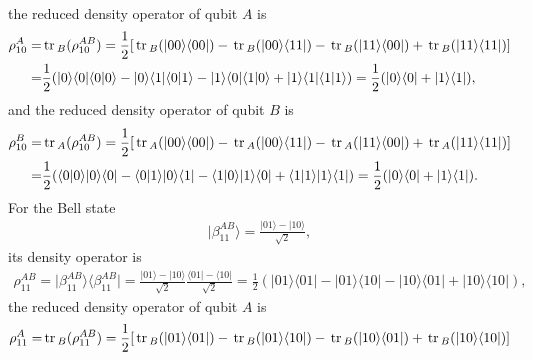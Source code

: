 \documentclass[en]{sol-man}
\begin{document}
\begin{sol}
\begin{align}
    \end{align}
    the reduced density operator of qubit $A$ is
    \begin{align}
        \notag\rho_{10}^A=&\,\mathrm{tr}\,_B(\rho_{10}^{AB})=\frac{1}{2}[\,\mathrm{tr}\,_B(\lvert 00\rangle\langle 00\rvert)-\,\mathrm{tr}\,_B(\lvert 00\rangle\langle 11\rvert)-\,\mathrm{tr}\,_B(\lvert 11\rangle\langle 00\rvert)+\,\mathrm{tr}\,_B(\lvert 11\rangle\langle 11\rvert)]\\
        =&\frac{1}{2}(\lvert 0\rangle\langle 0\rvert\langle 0\vert 0\rangle-\lvert 0\rangle\langle 1\rvert\langle 0\vert 1\rangle-\lvert 1\rangle\langle 0\rvert\langle 1\vert 0\rangle+\lvert 1\rangle\langle 1\rvert\langle 1\vert 1\rangle)=\frac{1}{2}(\lvert 0\rangle\langle 0\rvert+\lvert 1\rangle\langle 1\rvert),
    \end{align}
    and the reduced density operator of qubit $B$ is
    \begin{align}
        \notag\rho_{10}^B=&\,\mathrm{tr}\,_A(\rho_{10}^{AB})=\frac{1}{2}[\,\mathrm{tr}\,_A(\lvert 00\rangle\langle 00\rvert)-\,\mathrm{tr}\,_A(\lvert 00\rangle\langle 11\rvert)-\,\mathrm{tr}\,_A(\lvert 11\rangle\langle 00\rvert)+\,\mathrm{tr}\,_A(\lvert 11\rangle\langle 11\rvert)]\\
        =&\frac{1}{2}(\langle 0\vert 0\rangle\lvert 0\rangle\langle 0\rvert-\langle 0\vert 1\rangle\lvert 0\rangle\langle 1\rvert-\langle 1\vert 0\rangle\lvert 1\rangle\langle 0\rvert+\langle 1\vert 1\rangle\lvert 1\rangle\langle 1\rvert)=\frac{1}{2}(\lvert 0\rangle\langle 0\rvert+\lvert 1\rangle\langle 1\rvert).
    \end{align}
    For the Bell state
    \begin{align}
        \lvert\beta_{11}^{AB}\rangle=\frac{\lvert 01\rangle-\lvert 10\rangle}{\sqrt{2}},
    \end{align}
    its density operator is
    \begin{align}
        \rho_{11}^{AB}=\lvert\beta_{11}^{AB}\rangle\langle\beta_{11}^{AB}\rvert=\frac{\lvert 01\rangle-\lvert 10\rangle}{\sqrt{2}}\frac{\langle 01\rvert-\langle 10\rvert}{\sqrt{2}}=\frac{1}{2}(\lvert 01\rangle\langle 01\rvert-\lvert 01\rangle\langle 10\rvert-\lvert 10\rangle\langle 01\rvert+\lvert 10\rangle\langle 10\rvert),
    \end{align}
    the reduced density operator of qubit $A$ is
    \begin{align}
        \notag\rho_{11}^A=&\tr_B(\rho_{11}^{AB})=\frac{1}{2}[\tr_B(\lvert 01\rangle\langle 01\rvert)-\tr_B(\lvert 01\rangle\langle 10\rvert)-\tr_B(\lvert 10\rangle\langle 01\rvert)+\tr_B(\lvert 10\rangle\langle 10\rvert)]\\

\end{align}
\end{sol}
\end{document}
